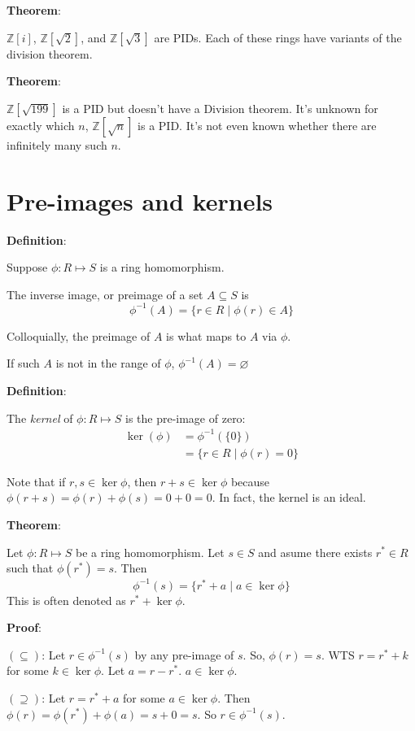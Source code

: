 \documentclass{article}
\begin{document}
\begin{multicols*}{2}
\textbf{Theorem}:

$\mathbb{Z}[i]$, $\mathbb{Z}[\sqrt{2}]$, and $\mathbb{Z}[\sqrt{3}]$ are PIDs. Each of these rings have variants of the division theorem.

\textbf{Theorem}:

$\mathbb{Z}[\sqrt{199}]$ is a PID but doesn't have a Division theorem. It's unknown for exactly which $n$, $\mathbb{Z}[\sqrt{n}]$ is a PID. It's not even known whether there are infinitely many such $n$.

\section{Pre-images and kernels}

\textbf{Definition}:

Suppose $\phi: R \mapsto S$ is a ring homomorphism.

The inverse image, or preimage of a set $A \subseteq S$ is \[\phi^{-1}(A) = \{r \in R \;|\; \phi(r) \in A\}\]

Colloquially, the preimage of $A$ is what maps to $A$ via $\phi$.

If such $A$ is not in the range of $\phi$, $\phi^{-1}(A) = \varnothing$

\textbf{Definition}:

The \textit{kernel} of $\phi: R \mapsto S$ is the pre-image of zero:\[\begin{aligned}
    \ker(\phi) &= \phi^{-1}(\{0\}) \\
    & = \{ r \in R \;|\; \phi (r) = 0\}
\end{aligned}\]

Note that if $r, s \in \ker \phi$, then $r+s \in \ker \phi$ because $\phi(r+s) = \phi(r) + \phi(s) = 0 + 0 = 0$. In fact, the kernel is an ideal.

\textbf{Theorem}:

Let $\phi : R \mapsto S$ be a ring homomorphism. Let $s \in S$ and asume there exists $r^* \in R$ such that $\phi(r^*) = s$. Then \[\phi^{-1}(s) = \{r^* + a \;|\; a \in \ker \phi\}\] This is often denoted as $r^* + \ker \phi$.

\textbf{Proof}:

$(\subseteq)$: Let $r \in \phi^{-1}(s)$ by any pre-image of $s$. So, $\phi(r) = s$. WTS $r = r^* + k$ for some $k \in \ker \phi$. Let $a = r - r^*$. $a \in \ker \phi$.

$(\supseteq)$: Let $r = r^* + a$ for some $a \in \ker \phi$. Then $\phi(r) = \phi(r^*) + \phi(a) = s + 0 = s$. So $r \in \phi^{-1}(s)$.


\end{multicols*}
\end{document}
